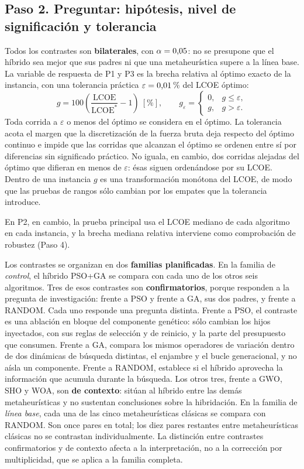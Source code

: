 \subsection{Paso 2. Preguntar: hipótesis, nivel de significación y tolerancia}

Todos los contrastes son \textbf{bilaterales}, con $\alpha=\text{0,05}$: no se presupone que el híbrido sea mejor que sus padres ni que una metaheurística supere a la línea base. La variable de respuesta de P1 y P3 es la brecha relativa al óptimo exacto de la instancia, con una tolerancia práctica $\varepsilon=\text{0,01}$\,\% del LCOE óptimo:
\begin{equation}
g=100\left(\frac{\mathrm{LCOE}}{\mathrm{LCOE}^{*}}-1\right)\ [\%],
\qquad
g_\varepsilon=
\begin{cases}
0, & g\leq\varepsilon,\\
g, & g>\varepsilon.
\end{cases}
\label{eq:brecha_tolerancia}
\end{equation}
Toda corrida a $\varepsilon$ o menos del óptimo se considera en el óptimo. La tolerancia acota el margen que la discretización de la fuerza bruta deja respecto del óptimo continuo e impide que las corridas que alcanzan el óptimo se ordenen entre sí por diferencias sin significado práctico. No iguala, en cambio, dos corridas alejadas del óptimo que difieran en menos de $\varepsilon$: ésas siguen ordenándose por su LCOE. Dentro de una instancia $g$ es una transformación monótona del LCOE, de modo que las pruebas de rangos sólo cambian por los empates que la tolerancia introduce.

En P2, en cambio, la prueba principal usa el LCOE mediano de cada algoritmo en cada instancia, y la brecha mediana relativa interviene como comprobación de robustez (Paso 4).

Los contrastes se organizan en dos \textbf{familias planificadas}. En la familia de \emph{control}, el híbrido PSO+GA se compara con cada uno de los otros seis algoritmos. Tres de esos contrastes son \textbf{confirmatorios}, porque responden a la pregunta de investigación: frente a PSO y frente a GA, sus dos padres, y frente a RANDOM. Cada uno responde una pregunta distinta. Frente a PSO, el contraste es una ablación en bloque del componente genético: sólo cambian los hijos inyectados, con sus reglas de selección y de reinicio, y la parte del presupuesto que consumen. Frente a GA, compara los mismos operadores de variación dentro de dos dinámicas de búsqueda distintas, el enjambre y el bucle generacional, y no aísla un componente. Frente a RANDOM, establece si el híbrido aprovecha la información que acumula durante la búsqueda. Los otros tres, frente a GWO, SHO y WOA, son \textbf{de contexto}: sitúan al híbrido entre las demás metaheurísticas y no sustentan conclusiones sobre la hibridación. En la familia de \emph{línea base}, cada una de las cinco metaheurísticas clásicas se compara con RANDOM. Son once pares en total; los diez pares restantes entre metaheurísticas clásicas no se contrastan individualmente. La distinción entre contrastes confirmatorios y de contexto afecta a la interpretación, no a la corrección por multiplicidad, que se aplica a la familia completa.

